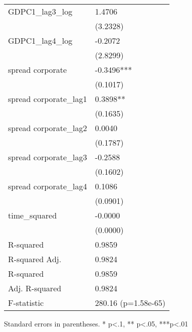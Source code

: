 \begin{table}
\begin{center}
\begin{tabular}{ll}
GDPC1\_lag3\_log       & 1.4706               \\
                       & (3.2328)             \\
GDPC1\_lag4\_log       & -0.2072              \\
                       & (2.8299)             \\
spread corporate       & -0.3496***           \\
                       & (0.1017)             \\
spread corporate\_lag1 & 0.3898**             \\
                       & (0.1635)             \\
spread corporate\_lag2 & 0.0040               \\
                       & (0.1787)             \\
spread corporate\_lag3 & -0.2588              \\
                       & (0.1602)             \\
spread corporate\_lag4 & 0.1086               \\
                       & (0.0901)             \\
time\_squared          & -0.0000              \\
                       & (0.0000)             \\
R-squared              & 0.9859               \\
R-squared Adj.         & 0.9824               \\
R-squared              & 0.9859               \\
Adj. R-squared         & 0.9824               \\
F-statistic            & 280.16 (p=1.58e-65)  \\
\hline
\end{tabular}
\end{center}
\end{table}
\bigskip
Standard errors in parentheses. \newline 
* p<.1, ** p<.05, ***p<.01